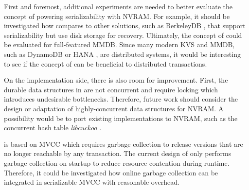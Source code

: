 First and foremost, additional experiments are needed to better evaluate the
concept of powering serializability with NVRAM. For example, it should be
investigated how \midas compares to other solutions, such as BerkeleyDB
\cite{olson1999berkeley}, that support serializability but use disk storage for
recovery. Ultimately, the concept of \midas could be evaluated for full-featured
MMDB. Since many modern KVS and MMDB, such as DynamoDB \cite{decandia2007dynamo}
or HANA \cite{lee2013sap}, are distributed systems, it would be interesting to
see if the concept of \midas can be beneficial to distributed transactions.

On the implementation side, there is also room for improvement. First, the
durable data structures in \midas are not concurrent and require locking which
introduces undesirable bottlenecks. Therefore, future work should consider the
design or adaptation of highly-concurrent data structures for NVRAM. A
possibility would be to port existing implementations to NVRAM, such as the
concurrent hash table \emph{libcuckoo} \cite{li2014algorithmic}.

\midas is based on MVCC which requires garbage collection to release versions
that are no longer reachable by any transaction. The current design of \midas
only performs garbage collection on startup to reduce resource contention during
runtime. Therefore, it could be investigated how online garbage collection
can be integrated in serializable MVCC with reasonable overhead.
